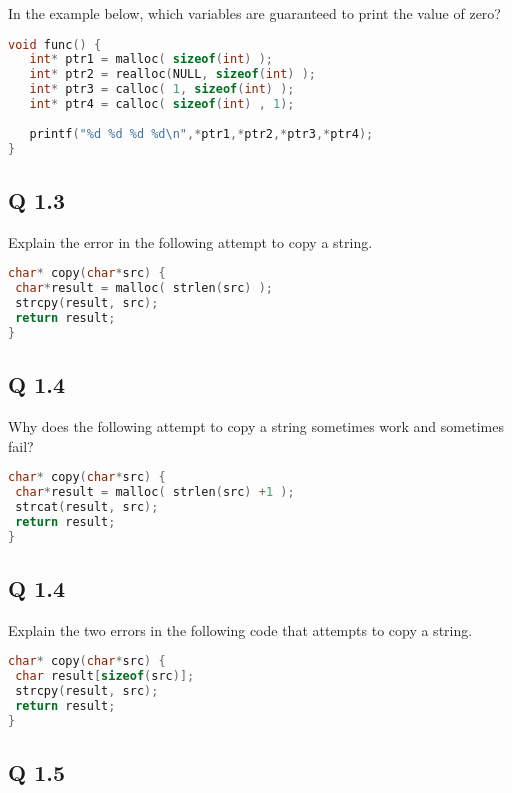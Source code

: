 In the example below, which variables are guaranteed to print the value of zero?

\begin{lstlisting}[language=C]
void func() {
   int* ptr1 = malloc( sizeof(int) );
   int* ptr2 = realloc(NULL, sizeof(int) );
   int* ptr3 = calloc( 1, sizeof(int) );
   int* ptr4 = calloc( sizeof(int) , 1);
   
   printf("%d %d %d %d\n",*ptr1,*ptr2,*ptr3,*ptr4);
}
\end{lstlisting}

\subsection{Q 1.3}\label{q-1.3}

Explain the error in the following attempt to copy a string.

\begin{lstlisting}[language=C]
char* copy(char*src) {
 char*result = malloc( strlen(src) ); 
 strcpy(result, src); 
 return result;
}
\end{lstlisting}

\subsection{Q 1.4}\label{q-1.4}

Why does the following attempt to copy a string sometimes work and sometimes fail?

\begin{lstlisting}[language=C]
char* copy(char*src) {
 char*result = malloc( strlen(src) +1 ); 
 strcat(result, src); 
 return result;
}
\end{lstlisting}

\subsection{Q 1.4}\label{q-1.4-1}

Explain the two errors in the following code that attempts to copy a string.

\begin{lstlisting}[language=C]
char* copy(char*src) {
 char result[sizeof(src)]; 
 strcpy(result, src); 
 return result;
}
\end{lstlisting}

\subsection{Q 1.5}\label{q-1.5}

